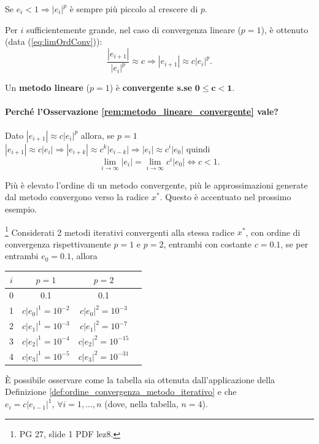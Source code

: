 \begin{remark}
	Se $e_i<1 \Rightarrow |e_i|^p$ è sempre più piccolo al crescere di $p$.
\end{remark}

\begin{remark}\label{rem:limOrdConv}
	Per $i$ sufficientemente grande, nel caso di convergenza lineare ($p=1$), è ottenuto (data (\ref{eq:limOrdConv})):
	\begin{equation*}
		\frac{|e_{i+1}|}{|e_i|^p}\approx c \Rightarrow |e_{i+1}|\approx c|e_i|^p.
	\end{equation*}
\end{remark}

\begin{remark}\label{rem:metodo_lineare_convergente}
	Un \textbf{\gls{metodo lineare}} ($p=1$) è \textbf{convergente s.se} $\boldsymbol{0\leq c<1}$.
\end{remark}

\paragraph{Perché l'Osservazione \ref{rem:metodo_lineare_convergente} vale?} Dato $|e_{i+1}|\approx c|e_i|^p$ allora, se $p=1$ $|e_{i+1}|\approx c|e_i|\Rightarrow |e_{i+k}|\approx c^k|e_{i-k}|\Rightarrow |e_i|\approx c^i|e_0|$ quindi
\begin{equation*}
	\underset{i\to\infty}{\lim}|e_i|=\underset{i\to\infty}{\lim}{c^i|e_0|}\iff c<1.
\end{equation*}

Più è elevato l'ordine di un metodo convergente, più le approssimazioni generate dal metodo convergono verso la radice $x^*$. Questo è accentuato nel prossimo esempio.

\begin{example}
	\footnote{PG 27, slide 1 PDF lez8.} Considerati 2 metodi iterativi convergenti alla stessa radice $x^*$, con ordine di convergenza rispettivamente $p=1$ e $p=2$, entrambi con costante $c=0.1$, se per entrambi $e_0=0.1$, allora
	\begin{center}
		\begin{tabular}{ |c|c|c|c| } 
			\hline
			$i$ & $p=1$ & $p=2$ \\
			\hline
			0 & 0.1 & 0.1 \\ 
			1 & $c|e_0|^1=10^{-2}$ & $c|e_0|^2=10^{-3}$ \\ 
			2 & $c|e_1|^1=10^{-3}$ & $c|e_1|^2=10^{-7}$\\
			3 & $c|e_2|^1=10^{-4}$ & $c|e_2|^2=10^{-15}$\\
			4 & $c|e_3|^1=10^{-5}$ & $c|e_3|^2=10^{-31}$\\
			\hline
		\end{tabular}
	\end{center}
	
	È possibile osservare come la tabella sia ottenuta dall'applicazione della Definizione \ref{def:ordine_convergenza_metodo_iterativo} e che $e_i=c|e_{i-1}|^1,\, \forall i=1,\hdots , n$ (dove, nella tabella, $n=4$).
\end{example}

